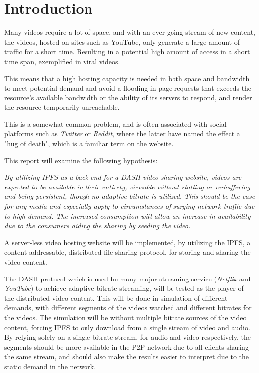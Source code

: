 \chapter{Introduction}
\label{cha:introduction}
Many videos require a lot of space, and with an ever going stream of new content, the videos, hosted on sites such as YouTube, only generate a large amount of traffic for a short time. Resulting in a potential high amount of access in a short time span, exemplified in viral videos. 

This means that a high hosting capacity is needed in both space and bandwidth to meet potential demand and avoid a flooding in page requests that exceeds the resource's available bandwidth or the ability of its servers to respond, and render the resource temporarily unreachable.

This is a somewhat common problem, and is often associated with social platforms such as \textit{Twitter} or \textit{Reddit}, where the latter have named the effect a "hug of death", which is a familiar term on the website.

\vspace{0.8cm}
\noindent This report will examine the following hypothesis:

\begin{displayquote}
    \textit{
        By utilizing \ac{IPFS} as a back-end for a \ac{DASH} video-sharing website, videos are expected to be available in their entirety, viewable without stalling or re-buffering and being persistent, though no adaptive bitrate is utilized.
        This should be the case for any media and especially apply to circumstances of surging network traffic due to high demand. The increased consumption will allow an increase in availability due to the consumers aiding the sharing by seeding the video.
    }
\end{displayquote}
\vspace{0.5cm}

A server-less video hosting website will be implemented, by utilizing the \ac{IPFS}, a content-addressable, distributed file-sharing protocol, for storing and sharing the video content.

The \ac{DASH} protocol which is used be many major streaming service (\eg \textit{Netflix} and \textit{YouTube}) to achieve adaptive bitrate streaming, will be tested as the player of the distributed video content. This will be done in simulation of different demands, with different segments of the videos watched and different bitrates for the videos. The simulation will be without multiple bitrate sources of the video content, forcing \ac{IPFS} to only download from a single stream of video and audio. By relying solely on a single bitrate stream, for audio and video respectively, the segments should be more available in the \ac{P2P} network due to all clients sharing the same stream, and should also make the results easier to interpret due to the static demand in the network.

